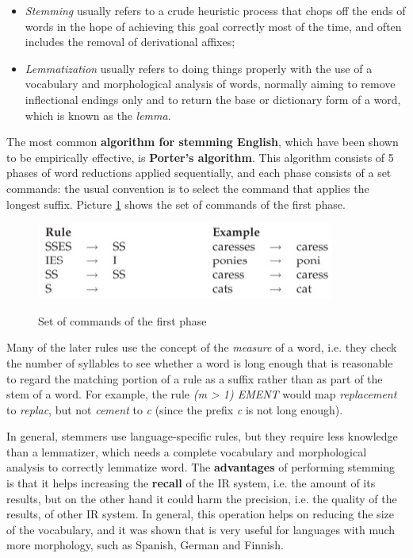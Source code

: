 \begin{itemize}
    \item \textit{Stemming} usually refers to a crude heuristic process that chops off the ends of words in the hope of achieving this goal correctly most of the time, and often includes the removal of derivational affixes;
    \item \textit{Lemmatization} usually refers to doing things properly with the use of a vocabulary and morphological analysis of words, normally aiming to remove inflectional endings only and to return the base or dictionary form of a word, which is known as the \textit{lemma}.
\end{itemize}

The most common \textbf{algorithm for stemming English}, which have been shown to be empirically effective, is \textbf{Porter's algorithm}. This algorithm consists of 5 phases of word reductions applied sequentially, and each phase consists of a set commands: the usual convention is to select the command that applies the longest suffix. Picture \ref{porter} shows the set of commands of the first phase.

\begin{figure}[h!]
		\centering
		\includegraphics[scale = 1.8]{img/porter.jpg}
		\label{porter}
        \caption{Set of commands of the first phase}
\end{figure}

Many of the later rules use the concept of the \textit{measure} of a word, i.e. they check the number of syllables to see whether a word is long enough that is reasonable to regard the matching portion of a rule as a suffix rather than as part of the stem of a word. For example, the rule \textit{(m > 1) EMENT} would map \textit{replacement} to \textit{replac}, but not \textit{cement} to \textit{c} (since the prefix \textit{c} is not long enough).

In general, stemmers use language-specific rules, but they require less knowledge than a lemmatizer, which needs a complete vocabulary and morphological analysis to correctly lemmatize word. The \textbf{advantages} of performing stemming is that it helps increasing the \textbf{recall} of the IR system, i.e. the amount of its results, but on the other hand it could harm the precision, i.e. the quality of the results, of other IR system. In general, this operation helps on reducing the size of the vocabulary, and it was shown that is very useful for languages with much more morphology, such as Spanish, German and Finnish.
